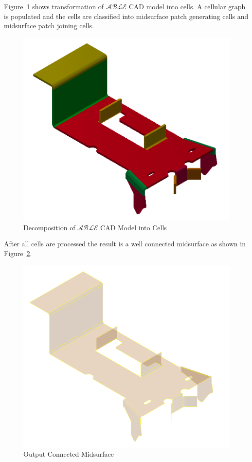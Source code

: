 Figure~\ref{fig:results:stdbracketdecomp} shows transformation of $\mathcal{ABLE}$ CAD model into cells. A cellular graph is populated and the cells are classified into midsurface patch generating cells and midsurface patch joining cells.


\begin{figure}[!h]
\centering     %
\includegraphics[width=0.62\linewidth,valign=t]{../Common/images/CommercialBracket_post_decomposition_model}
\caption{Decomposition of $\mathcal{ABLE}$ CAD Model into Cells}
\label{fig:results:stdbracketdecomp}
\end{figure}


After all cells are processed the result is a well connected midsurface as shown in Figure~\ref{fig:results:stdbracketdmidsurf}.


\begin{figure}[!h]
\centering     %
\includegraphics[width=0.62\linewidth,valign=t]{../Common/images/CommercialBracket_midsurfcelljoin_model}
\caption{Output Connected Midsurface}
\label{fig:results:stdbracketdmidsurf}
\end{figure}

